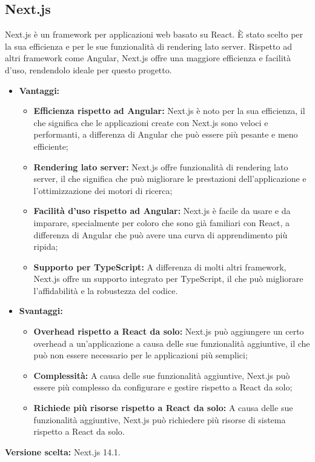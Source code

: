 \documentclass[10pt, a4paper]{article}
\begin{document}
\subsection{Next.js}
Next.js è un framework per applicazioni web basato su React. È stato scelto per la sua efficienza e per le sue funzionalità di rendering lato server. Rispetto ad altri framework come Angular, Next.js offre una maggiore efficienza e facilità d'uso, rendendolo ideale per questo progetto.

\begin{itemize}
\item \textbf{Vantaggi:}
\begin{itemize}
\item \textbf{Efficienza rispetto ad Angular:} Next.js è noto per la sua efficienza, il che significa che le applicazioni create con Next.js sono veloci e performanti, a differenza di Angular che può essere più pesante e meno efficiente;
\item \textbf{Rendering lato server:} Next.js offre funzionalità di rendering lato server, il che significa che può migliorare le prestazioni dell'applicazione e l'ottimizzazione dei motori di ricerca;
\item \textbf{Facilità d'uso rispetto ad Angular:} Next.js è facile da usare e da imparare, specialmente per coloro che sono già familiari con React, a differenza di Angular che può avere una curva di apprendimento più ripida;
\item \textbf{Supporto per TypeScript:} A differenza di molti altri framework, Next.js offre un supporto integrato per TypeScript, il che può migliorare l'affidabilità e la robustezza del codice.
\end{itemize}
\item \textbf{Svantaggi:}
\begin{itemize}
\item \textbf{Overhead rispetto a React da solo:} Next.js può aggiungere un certo overhead a un'applicazione a causa delle sue funzionalità aggiuntive, il che può non essere necessario per le applicazioni più semplici;
\item \textbf{Complessità:} A causa delle sue funzionalità aggiuntive, Next.js può essere più complesso da configurare e gestire rispetto a React da solo;
\item \textbf{Richiede più risorse rispetto a React da solo:} A causa delle sue funzionalità aggiuntive, Next.js può richiedere più risorse di sistema rispetto a React da solo.
\end{itemize}
\end{itemize}
\textbf{Versione scelta:} Next.js 14.1.
\end{document}
